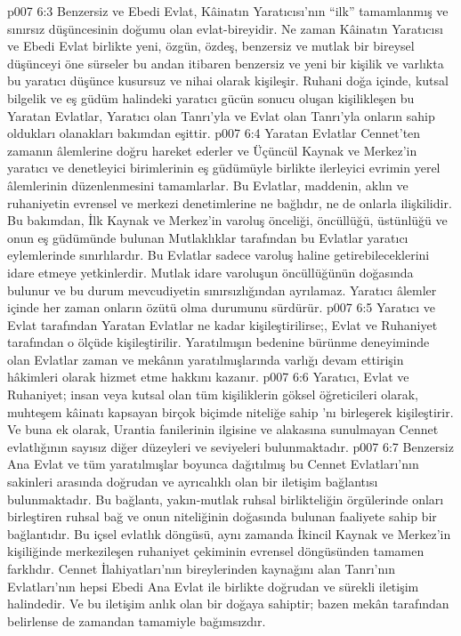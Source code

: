 \vs p007 6:3 Benzersiz ve Ebedi Evlat, Kâinatın Yaratıcısı’nın “ilk” tamamlanmış ve sınırsız düşüncesinin doğumu olan evlat\hyp{}bireyidir. Ne zaman Kâinatın Yaratıcısı ve Ebedi Evlat birlikte yeni, özgün, özdeş, benzersiz ve mutlak bir bireysel düşünceyi öne sürseler bu andan itibaren benzersiz  ve yeni bir kişilik ve varlıkta bu yaratıcı düşünce kusursuz ve nihai olarak kişileşir. Ruhani doğa içinde, kutsal bilgelik ve eş güdüm halindeki yaratıcı gücün sonucu oluşan kişilikleşen bu Yaratan Evlatlar, Yaratıcı olan Tanrı’yla ve Evlat olan Tanrı’yla onların sahip oldukları olanakları bakımdan eşittir.
\vs p007 6:4 Yaratan Evlatlar Cennet’ten zamanın âlemlerine doğru hareket ederler ve Üçüncül Kaynak ve Merkez’in yaratıcı ve denetleyici birimlerinin eş güdümüyle birlikte ilerleyici evrimin yerel âlemlerinin düzenlenmesini tamamlarlar. Bu Evlatlar, maddenin, aklın ve ruhaniyetin evrensel ve merkezi denetimlerine ne bağlıdır, ne de onlarla ilişkilidir. Bu bakımdan, İlk Kaynak ve Merkez’in varoluş önceliği, öncüllüğü, üstünlüğü ve onun eş güdümünde bulunan Mutlaklıklar tarafından bu Evlatlar yaratıcı eylemlerinde sınırlılardır. Bu Evlatlar sadece varoluş haline getirebileceklerini idare etmeye yetkinlerdir. Mutlak idare varoluşun öncüllüğünün doğasında bulunur ve bu durum mevcudiyetin sınırsızlığından ayrılamaz. Yaratıcı âlemler içinde her zaman onların özütü olma durumunu sürdürür.
\vs p007 6:5 Yaratıcı ve Evlat tarafından Yaratan Evlatlar ne kadar kişileştirilirse;, Evlat ve Ruhaniyet tarafından o ölçüde kişileştirilir. Yaratılmışın bedenine bürünme deneyiminde olan Evlatlar zaman ve mekânın yaratılmışlarında varlığı devam ettirişin hâkimleri olarak hizmet etme hakkını kazanır.
\vs p007 6:6 Yaratıcı, Evlat ve Ruhaniyet; insan veya kutsal olan tüm kişiliklerin göksel öğreticileri olarak, muhteşem kâinatı kapsayan birçok biçimde niteliğe sahip ’nı birleşerek kişileştirir. Ve buna ek olarak, Urantia fanilerinin ilgisine ve alakasına sunulmayan Cennet evlatlığının sayısız diğer düzeyleri ve seviyeleri bulunmaktadır.
\vs p007 6:7 Benzersiz Ana Evlat ve tüm yaratılmışlar boyunca dağıtılmış bu Cennet Evlatları’nın sakinleri arasında doğrudan ve ayrıcalıklı olan bir iletişim bağlantısı bulunmaktadır. Bu bağlantı, yakın\hyp{}mutlak ruhsal birlikteliğin örgülerinde onları birleştiren ruhsal bağ ve onun niteliğinin doğasında bulunan faaliyete sahip bir bağlantıdır. Bu içsel evlatlık döngüsü, aynı zamanda İkincil Kaynak ve Merkez’in kişiliğinde merkezileşen ruhaniyet çekiminin evrensel döngüsünden tamamen farklıdır. Cennet İlahiyatları’nın bireylerinden kaynağını alan Tanrı'nın Evlatları’nın hepsi Ebedi Ana Evlat ile birlikte doğrudan ve sürekli iletişim halindedir. Ve bu iletişim anlık olan bir doğaya sahiptir; bazen mekân tarafından belirlense de zamandan tamamiyle bağımsızdır.
